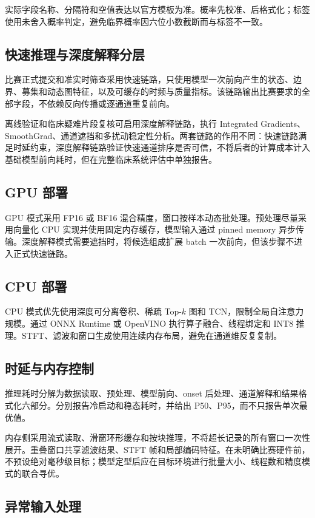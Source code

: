 实际字段名称、分隔符和空值表达以官方模板为准。概率先校准、后格式化；标签使用未舍入概率判定，避免临界概率因六位小数截断而与标签不一致。

\subsection{快速推理与深度解释分层}

比赛正式提交和准实时筛查采用快速链路，只使用模型一次前向产生的状态、边界、募集和动态图特征，以及可缓存的时频与质量指标。该链路输出比赛要求的全部字段，不依赖反向传播或逐通道重复前向。

离线验证和临床疑难片段复核可启用深度解释链路，执行 Integrated Gradients、SmoothGrad、通道遮挡和多扰动稳定性分析。两套链路的作用不同：快速链路满足时延约束，深度解释链路验证快速通道排序是否可信，不将后者的计算成本计入基础模型前向耗时，但在完整临床系统评估中单独报告。

\subsection{GPU 部署}

GPU 模式采用 FP16 或 BF16 混合精度，窗口按样本动态批处理。预处理尽量采用向量化 CPU 实现并使用固定内存缓存，模型输入通过 pinned memory 异步传输。深度解释模式需要遮挡时，将候选组成扩展 batch 一次前向，但该步骤不进入正式快速链路。

\subsection{CPU 部署}

CPU 模式优先使用深度可分离卷积、稀疏 Top-$k$ 图和 TCN，限制全局自注意力规模。通过 ONNX Runtime 或 OpenVINO 执行算子融合、线程绑定和 INT8 推理。STFT、滤波和窗口生成使用连续内存布局，避免在通道维反复复制。

\subsection{时延与内存控制}

推理耗时分解为数据读取、预处理、模型前向、onset 后处理、通道解释和结果格式化六部分。分别报告冷启动和稳态耗时，并给出 P50、P95，而不只报告单次最优值。

内存侧采用流式读取、滑窗环形缓存和按块推理，不将超长记录的所有窗口一次性展开。重叠窗口共享滤波结果、STFT 帧和局部编码特征。在未明确比赛硬件前，不预设绝对毫秒级目标；模型定型后应在目标环境进行批量大小、线程数和精度模式的联合寻优。

\subsection{异常输入处理}

